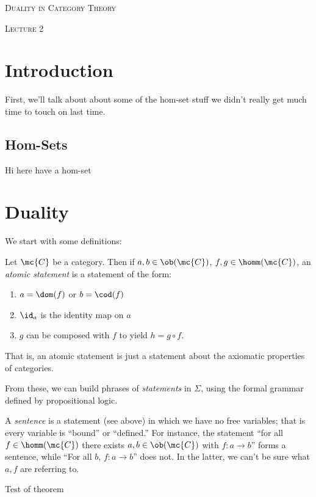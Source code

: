 \documentclass[nocover]{pset}
\begin{document}
\begin{center}
  {\scshape \huge Duality in Category Theory}

  {\scshape Lecture 2}
\end{center}
\vspace{-.1cm}
\hrulefill
\begin{adjustwidth}{1em}{1em}
  \section{Introduction}
  First, we'll talk about about some of the hom-set stuff we didn't
  really get much time to touch on last time.
  \subsection{Hom-Sets}
  Hi here have a hom-set
  \section{Duality}
  We start with some definitions:
  \begin{definition}
    Let $\mc{C}$ be a category. Then if $a,b \in \ob(\mc{C})$, $f,g
    \in \homm(\mc{C})$, an \emph{atomic statement} is a statement of
    the form:
    \begin{enumerate}
      \item $a = \dom(f)$ or $b = \cod(f)$
      \item $\id_a$ is the identity map on $a$
      \item $g$ can be composed with $f$ to yield $h = g \circ f$.
    \end{enumerate}
    That is, an atomic statement is just a statement about the
    axiomatic properties of categories.
  \end{definition}
  From these, we can build phrases of \emph{statements} in $\Sigma$,
  using the formal grammar defined by propositional logic.
  \begin{definition}[Sentences]
    A \emph{sentence} is a statement (see above) in which we have no
    free variables; that is every variable is ``bound'' or
    ``defined.'' For instance, the statement ``for all $f \in
    \homm(\mc{C})$ there exists $a,b \in \ob(\mc{C})$ with $f : a \to
    b$'' forms a sentence, while ``For all $b$, $f : a \to b$'' does
    not. In the latter, we can't be sure what $a,f$ are referring to.
  \end{definition}
  Test of theorem
  \begin{theorem}

\end{theorem}
\end{adjustwidth}
\end{document}
